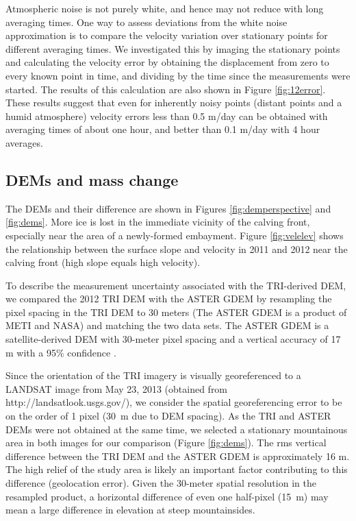 Atmospheric noise is not purely white, and hence may not reduce with long averaging times.  One way to assess deviations from the white noise approximation is to compare the velocity variation over stationary points for different averaging times. We investigated this by imaging the stationary points and calculating the velocity error by obtaining the displacement from zero to every known point in time, and dividing by the time since the measurements were started. The results of this calculation are also shown in Figure \ref{fig:12error}.  These results suggest that even for inherently noisy points (distant points and a humid atmosphere) velocity errors less than 0.5 m/day can be obtained with averaging times of about one hour, and better than 0.1 m/day with 4 hour averages.

\subsection{DEMs and mass change}
% 
The DEMs and their difference are shown in Figures \ref{fig:demperspective} and \ref{fig:dems}. More ice is lost in the immediate vicinity of the calving front, especially near the area of a newly-formed embayment.  Figure \ref{fig:velelev} shows the relationship between the surface slope and velocity in 2011 and 2012 near the calving front (high slope equals high velocity).




To describe the measurement uncertainty associated with the TRI-derived DEM, we compared the 2012 TRI DEM with the ASTER GDEM by resampling the pixel spacing in the TRI DEM to 30 meters (The ASTER GDEM is a product of METI and NASA) and matching the two data sets.  The ASTER GDEM is a satellite-derived DEM with 30-meter pixel spacing and a vertical accuracy of 17 m with a 95\% confidence \citep{aster2011validation}.  

Since the orientation of the TRI imagery is visually georeferenced to a LANDSAT image from May 23, 2013 (obtained from http://landsatlook.usgs.gov/), we consider the spatial georeferencing error to be on the order of 1 pixel (30~m due to DEM spacing). As the TRI and ASTER DEMs were not obtained at the same time, we selected a stationary mountainous area in both images for our comparison (Figure \ref{fig:dems}). The rms vertical difference between the TRI DEM and the ASTER GDEM is approximately 16 m. The high relief of the study area is likely an important factor contributing to this difference (geolocation error). Given the 30-meter spatial 
resolution in the 
resampled product, a horizontal difference of even one half-pixel (15~m) may 
mean a large difference in elevation at steep mountainsides.


